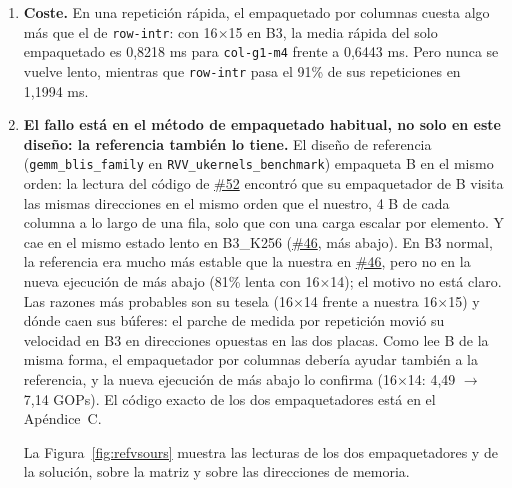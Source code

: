 \documentclass[10pt,a4paper]{article}
\newcommand{\iss}[1]{\href{https://github.com/JieGH/RVV_code_gen_via_MLIR_xDSL/issues/#1}{\##1}}
\begin{document}
\begin{enumerate}
  variación entre lanzamientos de 0,02 (3,88--3,90) y sin división en dos velocidades. Su empaquetado solo tarda de forma uniforme
  0,6448 ms (mediana), frente a 0,2500 ms de \texttt{col-g1-m4}. Una herramienta que separa las repeticiones en rápidas y lentas marca
  esta celda como 0\% lenta. Hay que leer los GOPs junto con la proporción lenta.
  \item \textbf{Coste.} En una repetición rápida, el empaquetado por columnas cuesta algo más que el de \texttt{row-intr}: con
  16$\times$15 en B3, la media rápida del solo empaquetado es 0,8218 ms para \texttt{col-g1-m4} frente a 0,6443 ms. Pero nunca se
  vuelve lento, mientras que \texttt{row-intr} pasa el 91\% de sus repeticiones en 1,1994 ms.
  \item \textbf{El fallo está en el método de empaquetado habitual, no solo en este diseño: la referencia también lo tiene.} El diseño
  de referencia (\texttt{gemm\_blis\_family} en \texttt{RVV\_ukernels\_benchmark}) empaqueta B en el mismo orden: la lectura del código
  de \iss{52} encontró que su empaquetador de B visita las mismas direcciones en el mismo orden que el nuestro, 4 B de cada columna a
  lo largo de una fila, solo que con una carga escalar por elemento. Y cae en el mismo estado lento en B3\_K256 (\iss{46}, más abajo).
  En B3 normal, la referencia era mucho más estable que la nuestra en \iss{46}, pero no en la nueva ejecución de más abajo (81\% lenta
  con 16$\times$14); el motivo no está claro. Las razones más probables son su tesela (16$\times$14 frente a nuestra 16$\times$15) y
  dónde caen sus búferes: el parche de medida por repetición movió su velocidad en B3 en direcciones opuestas en las dos placas. Como
  lee B de la misma forma, el empaquetador por columnas debería ayudar también a la referencia, y la nueva ejecución de más abajo lo
  confirma (16$\times$14: 4,49 $\to$ 7,14 GOPs). El código exacto de los dos empaquetadores está en el Apéndice~C.

  La Figura~\ref{fig:refvsours} muestra las lecturas de los dos empaquetadores y de la solución, sobre la matriz y sobre las direcciones
  de memoria.


\end{enumerate}
\end{document}
